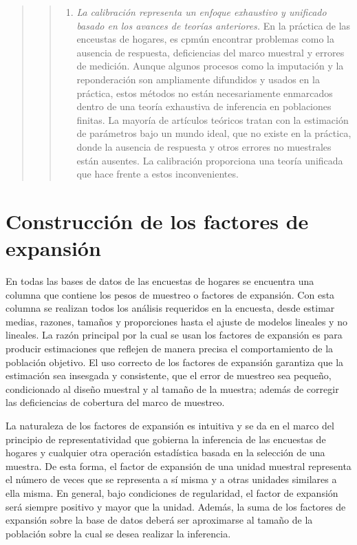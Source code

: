 \documentclass[
  12pt,
]{book}
\providecommand{\tightlist}{%
  \setlength{\itemsep}{0pt}\setlength{\parskip}{0pt}}
\begin{document}
\begin{quote}
\begin{quote}
\begin{enumerate}
\def\labelenumi{\arabic{enumi}.}
\setcounter{enumi}{3}
\tightlist
\item
  \emph{La calibración representa un enfoque exhaustivo y unificado basado en los avances de teorías anteriores.} En la práctica de las enceustas de hogares, es cpmún encontrar problemas como la ausencia de respuesta, deficiencias del marco muestral y errores de medición. Aunque algunos procesos como la imputación y la reponderación son ampliamente difundidos y usados en la práctica, estos métodos no están necesariamente enmarcados dentro de una teoría exhaustiva de inferencia en poblaciones finitas. La mayoría de artículos teóricos tratan con la estimación de parámetros bajo un mundo ideal, que no existe en la práctica, donde la ausencia de respuesta y otros errores no muestrales están ausentes. La calibración proporciona una teoría unificada que hace frente a estos inconvenientes.
\end{enumerate}
\end{quote}
\end{quote}

\hypertarget{construcciuxf3n-de-los-factores-de-expansiuxf3n}{%
\chapter{Construcción de los factores de expansión}\label{construcciuxf3n-de-los-factores-de-expansiuxf3n}}

En todas las bases de datos de las encuestas de hogares se encuentra una columna que contiene los pesos de muestreo o factores de expansión. Con esta columna se realizan todos los análisis requeridos en la encuesta, desde estimar medias, razones, tamaños y proporciones hasta el ajuste de modelos lineales y no lineales. La razón principal por la cual se usan los factores de expansión es para producir estimaciones que reflejen de manera precisa el comportamiento de la población objetivo. El uso correcto de los factores de expansión garantiza que la estimación sea insesgada y consistente, que el error de muestreo sea pequeño, condicionado al diseño muestral y al tamaño de la muestra; además de corregir las deficiencias de cobertura del marco de muestreo.

La naturaleza de los factores de expansión es intuitiva y se da en el marco del principio de representatividad que gobierna la inferencia de las encuestas de hogares y cualquier otra operación estadística basada en la selección de una muestra. De esta forma, el factor de expansión de una unidad muestral representa el número de veces que se representa a sí misma y a otras unidades similares a ella misma. En general, bajo condiciones de regularidad, el factor de expansión será siempre positivo y mayor que la unidad. Además, la suma de los factores de expansión sobre la base de datos deberá ser aproximarse al tamaño de la población sobre la cual se desea realizar la inferencia.
\end{document}
